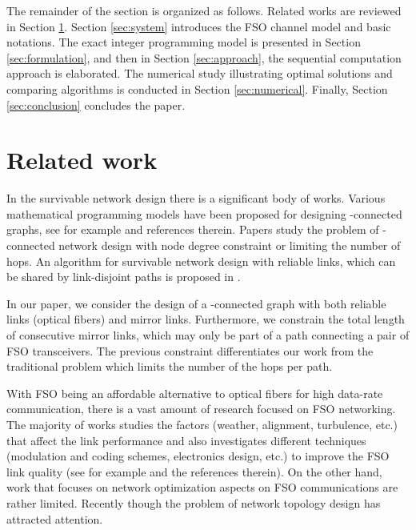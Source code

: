 \documentclass[onecolumn,11pt,draftclsnofoot]{IEEEtran}
\begin{document}
The remainder of the section is organized as follows. Related works are reviewed in Section \ref{sec:relate}.  Section \ref{sec:system} introduces the FSO channel model and basic notations. The exact integer programming model is presented in Section \ref{sec:formulation}, and then in Section \ref{sec:approach}, the sequential computation approach is elaborated. The numerical study illustrating optimal solutions and comparing algorithms is conducted in Section \ref{sec:numerical}. Finally, Section \ref{sec:conclusion} concludes the paper.

\section{Related work} \label{sec:relate}
In the survivable network design there is a significant body of works. Various mathematical programming models have been proposed for designing -connected graphs, see for example
\cite{Kerivin2005} and references therein. Papers \cite{Khandekar2013,Bendali2010,Botton2013} study the problem of -connected network design with node degree constraint or limiting the number of hops. An algorithm for survivable network design with reliable links, which can be shared by link-disjoint paths is proposed in \cite{Zotkiewicz2010}.

In our paper, we consider the design of a -connected graph with both reliable links (optical fibers) and mirror links. Furthermore, we constrain the total length of consecutive mirror links, which may only be part of a path connecting a pair of FSO transceivers. The previous constraint differentiates our work from the traditional problem which limits the number of the hops per path.

With FSO being an affordable alternative to optical fibers for high data-rate communication,  there is a vast amount of research focused on FSO networking. The majority of works studies the factors (weather, alignment, turbulence, etc.) that affect the link performance and also investigates different techniques (modulation and coding schemes, electronics design, etc.) to improve the FSO link quality (see for example \cite{Borah2012} and the references therein). On the other hand, work that focuses on network optimization aspects on FSO communications are rather limited. Recently though the problem of network topology design has attracted attention.
\end{document}

